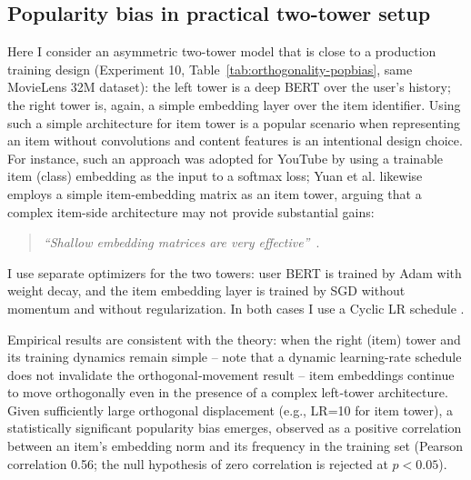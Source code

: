 \subsection{Popularity bias in practical two-tower setup}

Here I consider an asymmetric two-tower model that is close to a production training design (Experiment 10, Table~\ref{tab:orthogonality-popbias}, same MovieLens 32M dataset): the left tower is a deep BERT over the user's history; the right tower is, again, a simple embedding layer over the item identifier. 
Using such a simple architecture for item tower is a popular scenario when representing an item without convolutions and content features is an intentional design choice. 
For instance, such an approach was adopted for YouTube \cite{covington2016youtube} by using a trainable item (class) embedding as the input to a softmax loss; 
Yuan et al.  likewise employs a simple item-embedding matrix as an item tower, arguing that a complex item-side architecture may not provide substantial gains:
\begin{quote}
\emph{“Shallow embedding matrices are very effective”}\, \citep[p.~6]{yuan2024contextgnn}.
\end{quote}

I use separate optimizers for the two towers: user BERT is trained by Adam with weight decay, and the item embedding layer is trained by SGD without momentum and without regularization. 
In both cases I use a Cyclic LR schedule \cite{smith2017clr}. 

Empirical results are consistent with the theory: when the right (item) tower and its training dynamics remain simple -- note that a dynamic learning-rate schedule does not invalidate the orthogonal‑movement result -- item embeddings continue to move orthogonally even in the presence of a complex left‑tower architecture.
Given sufficiently large orthogonal displacement (e.g., LR=10 for item tower), a statistically significant popularity bias emerges, observed as a positive correlation between an item’s embedding norm and its frequency in the training set (Pearson correlation 0.56; the null hypothesis of zero correlation is rejected at $p<0.05$).


